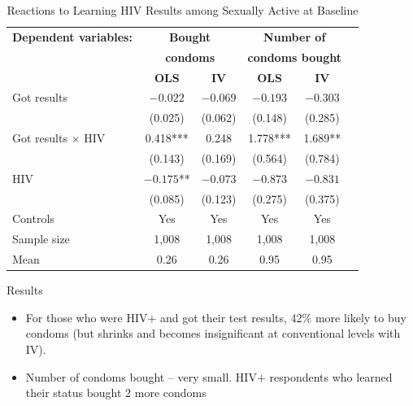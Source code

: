 \documentclass{beamer}
\begin{document}
\begin{frame}[plain]

  \begin{table}[htb]\centering
    \scriptsize
    \caption{Reactions to Learning HIV Results among Sexually Active at Baseline}
    \label{tab:thornton_condoms}
    \centering
    \begin{threeparttable}
      \begin{tabular}{l*{5}{c}}
        \toprule
        \multicolumn{1}{l}{\textbf{Dependent variables:}}&
        \multicolumn{2}{c}{\textbf{Bought}}&
        \multicolumn{2}{c}{\textbf{Number of}}\\
        \multicolumn{1}{l}{}&
        \multicolumn{2}{c}{\textbf{condoms}}&
        \multicolumn{2}{c}{\textbf{condoms bought}}\\
        \multicolumn{1}{l}{}&
        \multicolumn{1}{c}{\textbf{OLS}}&
        \multicolumn{1}{c}{\textbf{IV}}&
        \multicolumn{1}{c}{\textbf{OLS}}&
        \multicolumn{1}{c}{\textbf{IV}}\\
        \midrule
        Got results              & $-0.022$   & $-0.069$ & $-0.193$ & $-0.303$
        \\
                                 & (0.025)    & (0.062)  & (0.148)  & (0.285)
        \\
        Got results $\times$ HIV & 0.418***   & 0.248    & 1.778*** & 1.689**
        \\
                                 & (0.143)    & (0.169)  & (0.564)  & (0.784)  \\
        HIV                      & $-0.175$** & $-0.073$ & $-0.873$ & $-0.831$
        \\
                                 & (0.085)    & (0.123)  & (0.275)  & (0.375)  \\\midrule
        Controls                 & Yes        & Yes      & Yes      & Yes
        \\
        Sample size              & 1,008      & 1,008    & 1,008    & 1,008    \\
        Mean                     & 0.26       & 0.26     & 0.95     & 0.95     \\
        \bottomrule
      \end{tabular}
    \end{threeparttable}
  \end{table}

\end{frame}

\begin{frame}{Results}

  \begin{itemize}
    \item For those who were HIV$+$ and got their test results, 42\% more likely to buy condoms (but shrinks and becomes insignificant at conventional levels with IV).
    \item Number of condoms bought -- very small. HIV$+$ respondents who learned their status bought 2 more condoms
  \end{itemize}

\end{frame}
\end{document}
